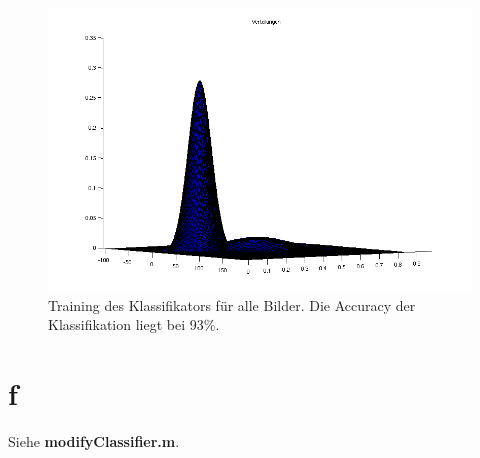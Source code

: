 \documentclass[a4paper,10pt]{article}
\begin{document}
\begin{figure}[htbp]
  \centering
    \includegraphics[width=1\linewidth]{plot7.png}
  \caption{Training des Klassifikators für alle Bilder. Die Accuracy der Klassifikation liegt bei 93\%.}
\end{figure}
\section{f}

Siehe \textbf{modifyClassifier.m}. 
\end{document}
